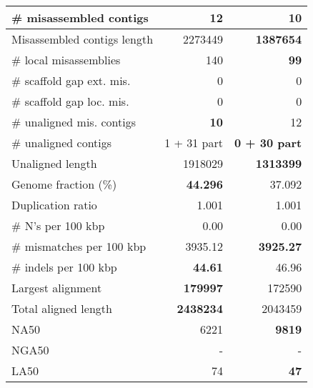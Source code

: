 \documentclass[12pt,a4paper]{article}
\begin{document}
\begin{table}[ht]
\begin{center}
\begin{tabular}{|l*{2}{|r}|}
\# misassembled contigs & 12 & {\bf 10} \\ \hline
Misassembled contigs length & 2273449 & {\bf 1387654} \\ \hline
\# local misassemblies & 140 & {\bf 99} \\ \hline
\# scaffold gap ext. mis. & 0 & 0 \\ \hline
\# scaffold gap loc. mis. & 0 & 0 \\ \hline
\# unaligned mis. contigs & {\bf 10} & 12 \\ \hline
\# unaligned contigs & 1 + 31 part & {\bf 0 + 30 part} \\ \hline
Unaligned length & 1918029 & {\bf 1313399} \\ \hline
Genome fraction (\%) & {\bf 44.296} & 37.092 \\ \hline
Duplication ratio & 1.001 & 1.001 \\ \hline
\# N's per 100 kbp & 0.00 & 0.00 \\ \hline
\# mismatches per 100 kbp & 3935.12 & {\bf 3925.27} \\ \hline
\# indels per 100 kbp & {\bf 44.61} & 46.96 \\ \hline
Largest alignment & {\bf 179997} & 172590 \\ \hline
Total aligned length & {\bf 2438234} & 2043459 \\ \hline
NA50 & 6221 & {\bf 9819} \\ \hline
NGA50 & - & - \\ \hline
LA50 & 74 & {\bf 47} \\ \hline
\end{tabular}
\end{center}
\end{table}
\end{document}
